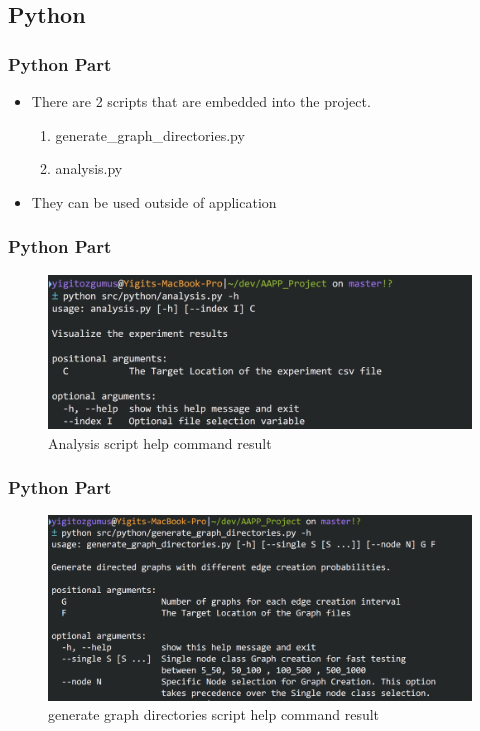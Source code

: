 \documentclass{beamer}
\begin{document}
		\subsection{Python}
		\begin{frame}
			\frametitle{Python Part}
			\begin{itemize}
				\item <1-> There are 2 scripts that are embedded into the project.
				\begin{enumerate}
					\item <1-> generate\_graph\_directories.py
					\item <2-> analysis.py
				\end{enumerate} 
				\item <3-> They can be used outside of application
			\end{itemize}
		\end{frame}
		\begin{frame}
			\frametitle{Python Part}
			\begin{figure}[h!]
				\centering
				\includegraphics[width=1\textwidth]{analysis}
				\caption{Analysis script help command result}
			\end{figure}		
		\end{frame}
		\begin{frame}
			\frametitle{Python Part}
			\begin{figure}[h!]
				\centering
				\includegraphics[width=1\textwidth]{generate}
				\caption{generate graph directories script help command result}
			\end{figure}
		\end{frame}
\end{document}
